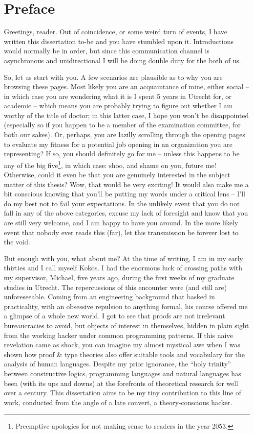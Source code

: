 \chapter*{Preface}

Greetings, reader. Out of coincidence, or some weird turn of events, I have written this dissertation to-be and you have stumbled upon it.
Introductions would normally be in order, but since this communication channel is asynchronous and unidirectional I will be doing double duty for the both of us.

So, let us start with you. 
A few scenarios are plausible as to why you are browsing these pages. 
Most likely you are an acquaintance of mine, either social – in which case you are wondering what it is I spent 5 years in Utrecht for, or academic – which means you are probably trying to figure out whether I am worthy of the title of doctor; 
in this latter case, I hope you won’t be disappointed (especially so if you happen to be a member of the examination committee, for both our sakes).
Or, perhaps, you are lazilly scrolling through the opening pages to evaluate my fitness for a potential job opening in an organization you are representing? 
If so, you should definitely go for me – unless this happens to be any of the big five\footnote{Preemptive
apologies for not making sense to readers in the year 2053.}, in which case: shoo, and shame on you, future me!
Otherwise, could it even be that you are genuinely interested in the subject matter of this thesis? 
Wow, that would be very exciting! 
It would also make me a bit conscious knowing that you’ll be putting my words under a critical lens – I’ll do my best not to fail your expectations. 
In the unlikely event that you do not fall in any of the above categories, excuse my lack of foresight and know that you are still very welcome, and I am happy to have you around. 
In the more likely event that nobody ever reads this (far), let this transmission be forever lost to the void.

But enough with you, what about me? 
At the time of writing, I am in my early thirties and I call myself Kokos. 
I had the enormous luck of crossing paths with my supervisor, Michael, five years ago, during the first weeks of my graduate studies in Utrecht. 
The repercussions of this encounter were (and still are) unforeseeable. 
Coming from an engineering background that basked in practicality, with an obsessive repulsion to anything formal, his course offered me a glimpse of a whole new world. 
I got to see that proofs are not irrelevant bureaucracies to avoid, but objects of interest in themselves, hidden in plain sight from the working hacker under common programming patterns. 
If this naive revelation came as shock, you can imagine my almost mystical awe when I was shown how proof \& type theories also offer suitable tools and vocabulary for the analysis of human languages. 
Despite my prior ignorance, the “holy trinity” between constructive logics, programming languages and natural languages has been (with its ups and downs) at the forefronts of theoretical research for well over a century. 
This dissertation aims to be my tiny contribution to this line of work, conducted from the angle of a late convert, a theory-conscious hacker. 

